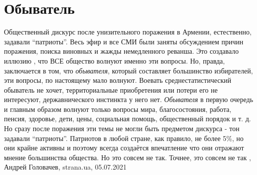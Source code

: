  
 
 
 
 
\chapter{Обыватель}

Общественный дискурс после унизительного поражения в Армении, естественно,
задавали \enquote{патриоты}. Весь эфир и все СМИ были заняты обсуждением причин
поражения, поиска виновных и жажды немедленного реванша. Это создавало иллюзию
, что ВСЕ общество волнуют именно эти вопросы. Но, правда, заключается в том,
что \emph{обывателя}, который составляет большинство избирателей, эти вопросы, по
настоящему мало волнуют. Воевать среднестатистический обыватель не хочет,
территориальные приобретения или потери его не интересуют, державнического
инстинкта у него нет. \emph{Обывателя} в первую очередь и главным образом волнуют
только вопросы мира, благосостояния, работа, пенсия, здоровье, дети, цены,
социальная помощь, общественный порядок и т. д. Но сразу после поражения эти
темы не могли быть предметом дискурса - тон задавали \enquote{патриоты}. Патриотов в
любой стране, как правило, не более 5\%, но они крайне активны и поэтому
всегда создаётся впечатление что они отражают мнение большинства общества. Но
это совсем не так. Точнее, это совсем не так
, 
Андрей Головачев, strana.ua, 05.07.2021
